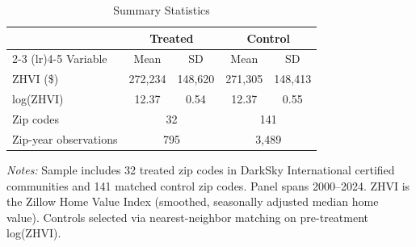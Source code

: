 
\begin{table}[H]
\centering
\caption{Summary Statistics}
\label{tab:summary}
\begin{threeparttable}
\begin{tabular}{lcccc}
\toprule
 & \multicolumn{2}{c}{Treated} & \multicolumn{2}{c}{Control} \\
\cmidrule(lr){2-3} \cmidrule(lr){4-5}
Variable & Mean & SD & Mean & SD \\
\midrule
ZHVI (\$) & 272,234 & 148,620 & 271,305 & 148,413 \\
log(ZHVI) & 12.37 & 0.54 & 12.37 & 0.55 \\
\midrule
Zip codes & \multicolumn{2}{c}{32} & \multicolumn{2}{c}{141} \\
Zip-year observations & \multicolumn{2}{c}{795} & \multicolumn{2}{c}{3,489} \\
\bottomrule
\end{tabular}
\begin{tablenotes}[flushleft]
\small
\item \textit{Notes:} Sample includes 32 treated zip codes in DarkSky International certified communities and 141 matched control zip codes. Panel spans 2000--2024. ZHVI is the Zillow Home Value Index (smoothed, seasonally adjusted median home value). Controls selected via nearest-neighbor matching on pre-treatment log(ZHVI).
\end{tablenotes}
\end{threeparttable}
\end{table}
